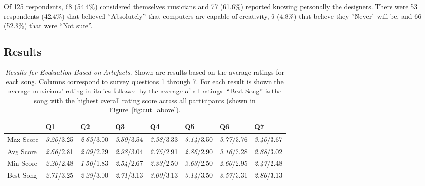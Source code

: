 \documentclass[phd,electronic,oneside,twosidetoc,letterpaper,chaptercenter,parttop,lof,lot]{byumsphd}
\begin{document}
Of 125 respondents, 68 (54.4\%) considered themselves musicians and 77 (61.6\%) reported knowing personally the designers. There were 53 respondents (42.4\%) that believed ``Absolutely'' that computers are capable of creativity, 6 (4.8\%) that believe they ``Never'' will be, and 66 (52.8\%) that were ``Not sure''.

\subsection{Results}


\begin{table}[]
\footnotesize
\centering
\begin{tabular}{@{}llllllll@{}}
                    & Q1 & Q2 & Q3 & Q4 & Q5 & Q6 & Q7 \\ \midrule
Max Score           & \textit{3.20}/3.25    & \textit{2.63}/3.00   & \textit{3.50}/3.54  & \textit{3.38}/3.33      & \textit{3.14}/3.50       & \textit{3.77}/3.76    & \textit{3.40}/3.67      \\
Avg Score           & \textit{2.66}/2.81    & \textit{2.09}/2.29   & \textit{2.98}/3.04  & \textit{2.75}/2.91      & \textit{2.86}/2.90      & \textit{3.16}/3.28    & \textit{2.88}/3.02      \\
Min Score           & \textit{2.20}/2.48    & \textit{1.50}/1.83   & \textit{2.54}/2.67  & \textit{2.33}/2.50      & \textit{2.63}/2.50       & \textit{2.60}/2.95    & \textit{2.47}/2.48      \\
Best Song & \textit{2.71}/3.25    & \textit{2.29}/3.00   & \textit{2.71}/3.13  & \textit{3.00}/3.13      & \textit{3.14}/3.50       & \textit{3.57}/3.31    & \textit{2.86}/3.13      \\
\end{tabular}
\caption{\label{tab:results}\textit{Results for Evaluation Based on Artefacts}. Shown are results based on the average ratings for each song. Columns correspond to survey questions 1 through 7. For each result is shown the average musicians' rating in italics followed by the average of all ratings. ``Best Song'' is the song with the highest overall rating score across all participants (shown in Figure~\ref{fig:cut_above}).}
\end{table}
\end{document}
